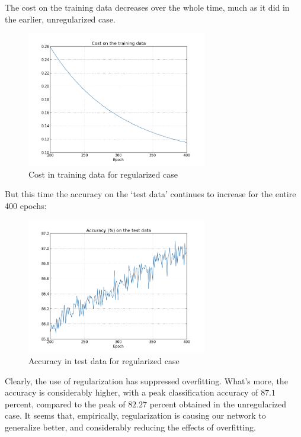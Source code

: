 \documentclass[12 pt]{article}
\begin{document}
The cost on the training data decreases over the whole time, much as it
did in the earlier, unregularized case.

\begin{figure}[htp]
\centering
\includegraphics[width=0.7\textwidth]{./figs/regularized1.png}
\caption{Cost in training data for regularized case}
\end{figure}

But this time the accuracy on the `test data' continues to increase for
the entire 400 epochs:

\begin{figure}[htp]
\centering
\includegraphics[width=0.7\textwidth]{./figs/regularized2.png}
\caption{Accuracy in test data for regularized case}
\end{figure}

Clearly, the use of regularization has suppressed overfitting. What's
more, the accuracy is considerably higher, with a peak classification
accuracy of $ 87.1 $ percent, compared to the peak of $ 82.27 $
percent obtained in the unregularized case. It seems that, empirically,
regularization is causing our network to generalize better, and
considerably reducing the effects of overfitting.
\end{document}
